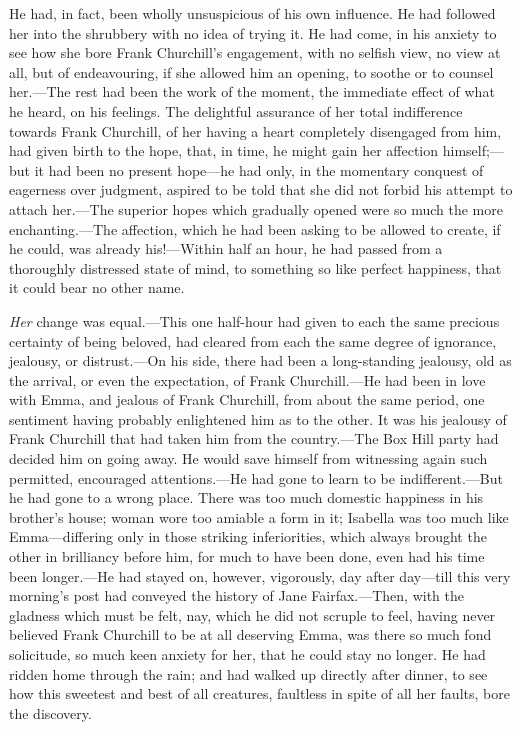 He had, in fact, been wholly unsuspicious of his own influence. He had followed her into the shrubbery with no idea of trying it. He had come, in his anxiety to see how she bore Frank Churchill's engagement, with no selfish view, no view at all, but of endeavouring, if she allowed him an opening, to soothe or to counsel her.---The rest had been the work of the moment, the immediate effect of what he heard, on his feelings. The delightful assurance of her total indifference towards Frank Churchill, of her having a heart completely disengaged from him, had given birth to the hope, that, in time, he might gain her affection himself;---but it had been no present hope---he had only, in the momentary conquest of eagerness over judgment, aspired to be told that she did not forbid his attempt to attach her.---The superior hopes which gradually opened were so much the more enchanting.---The affection, which he had been asking to be allowed to create, if he could, was already his!---Within half an hour, he had passed from a thoroughly distressed state of mind, to something so like perfect happiness, that it could bear no other name.

{\em Her} change was equal.---This one half-hour had given to each the same precious certainty of being beloved, had cleared from each the same degree of ignorance, jealousy, or distrust.---On his side, there had been a long-standing jealousy, old as the arrival, or even the expectation, of Frank Churchill.---He had been in love with Emma, and jealous of Frank Churchill, from about the same period, one sentiment having probably enlightened him as to the other. It was his jealousy of Frank Churchill that had taken him from the country.---The Box Hill party had decided him on going away. He would save himself from witnessing again such permitted, encouraged attentions.---He had gone to learn to be indifferent.---But he had gone to a wrong place. There was too much domestic happiness in his brother's house; woman wore too amiable a form in it; Isabella was too much like Emma---differing only in those striking inferiorities, which always brought the other in brilliancy before him, for much to have been done, even had his time been longer.---He had stayed on, however, vigorously, day after day---till this very morning's post had conveyed the history of Jane Fairfax.---Then, with the gladness which must be felt, nay, which he did not scruple to feel, having never believed Frank Churchill to be at all deserving Emma, was there so much fond solicitude, so much keen anxiety for her, that he could stay no longer. He had ridden home through the rain; and had walked up directly after dinner, to see how this sweetest and best of all creatures, faultless in spite of all her faults, bore the discovery.

